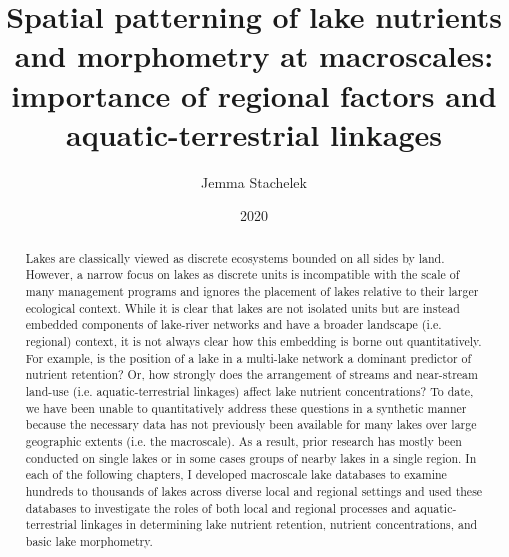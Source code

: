 \documentclass[]{msu-thesis}
\title{Spatial patterning of lake nutrients and morphometry at macroscales: importance of regional factors and aquatic-terrestrial linkages}
\author{Jemma Stachelek}
\date{2020}
\theoremstyle{definition}
\theoremstyle{definition}
\theoremstyle{definition}
\theoremstyle{remark}
\begin{document}

\maketitlepage
\begin{abstract}
Lakes are classically viewed as discrete ecosystems bounded on all sides by land. However, a narrow focus on lakes as discrete units is incompatible with the scale of many management programs and ignores the placement of lakes relative to their larger ecological context. While it is clear that lakes are not isolated units but are instead embedded components of lake-river networks and have a broader landscape (i.e. regional) context, it is not always clear how this embedding is borne out quantitatively. For example, is the position of a lake in a multi-lake network a dominant predictor of nutrient retention? Or, how strongly does the arrangement of streams and near-stream land-use (i.e. aquatic-terrestrial linkages) affect lake nutrient concentrations? To date, we have been unable to quantitatively address these questions in a synthetic manner because the necessary data has not previously been available for many lakes over large geographic extents (i.e. the macroscale). As a result, prior research has mostly been conducted on single lakes or in some cases groups of nearby lakes in a single region. In each of the following chapters, I developed macroscale lake databases to examine hundreds to thousands of lakes across diverse local and regional settings and used these databases to investigate the roles of both local and regional processes and aquatic-terrestrial linkages in determining lake nutrient retention, nutrient concentrations, and basic lake morphometry.


\end{abstract}
\end{document}
